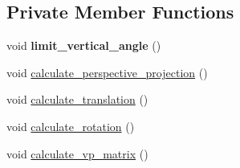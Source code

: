 \subsection*{Private Member Functions}
\begin{DoxyCompactItemize}
\item 
\mbox{\label{classagl_1_1Camera_a8e6ac2844105370dbee5da609bfd999f}} 
void {\bfseries limit\+\_\+vertical\+\_\+angle} ()
\item 
void \mbox{\hyperlink{classagl_1_1Camera_a75ae39c49e4ccc6c850eb32a9bb70e93}{calculate\+\_\+perspective\+\_\+projection}} ()
\item 
void \mbox{\hyperlink{classagl_1_1Camera_a03a502bcfaa24c6469f3357e1df43118}{calculate\+\_\+translation}} ()
\item 
void \mbox{\hyperlink{classagl_1_1Camera_a88af7620d31f286d147b0b4df84d5077}{calculate\+\_\+rotation}} ()
\item 
void \mbox{\hyperlink{classagl_1_1Camera_abfff009a6419e7f5e203b3081f840dfc}{calculate\+\_\+vp\+\_\+matrix}} ()
\end{DoxyCompactItemize}
